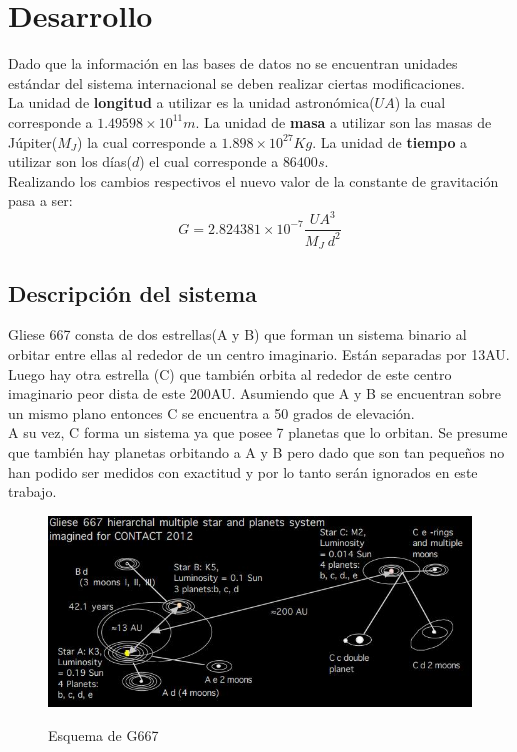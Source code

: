 \documentclass[11pt,a4paper]{article}
\begin{document}
\section{\label{desa}Desarrollo}
{
Dado que la información en las bases de datos no se encuentran unidades estándar del sistema internacional se deben realizar ciertas modificaciones.\\
La unidad de \textbf{longitud} a utilizar es la unidad astronómica($UA$) la cual corresponde a $1.49598 \times 10^{11} m$.
La unidad de \textbf{masa} a utilizar son las masas de Júpiter($M_J$) la cual  corresponde a $1.898 \times 10^{27} Kg$.
La unidad de \textbf{tiempo} a utilizar son los días($d$) el cual corresponde a $86400 s$.\\

Realizando los cambios respectivos el nuevo valor de la constante de gravitación pasa a ser:
\begin{equation}
G = 2.824381 \times 10^{-7} \dfrac{UA^3}{M_J\ d^2}
\end{equation}
\subsection{\label{descr}Descripción del sistema}
{
Gliese 667 consta de dos estrellas(A y B) que forman un sistema binario al orbitar entre ellas al rededor de un centro imaginario. Están separadas por 13AU. Luego hay otra estrella (C) que también orbita al rededor de este centro imaginario peor dista de este 200AU. Asumiendo que A y B se encuentran sobre un mismo plano entonces C se encuentra a 50 grados de elevación.\\

A su vez, C forma un sistema ya que posee 7 planetas que lo orbitan. Se presume que también hay planetas orbitando a A y B pero dado que son tan pequeños no han podido ser medidos con exactitud y por lo tanto serán ignorados en este trabajo.
\begin{figure}[h!]
\begin{center}
\includegraphics[scale=0.7]{G667.jpg}
\label{fig:G667}
\caption{Esquema de G667}
\end{center}
\end{figure}
}

}
\end{document}

